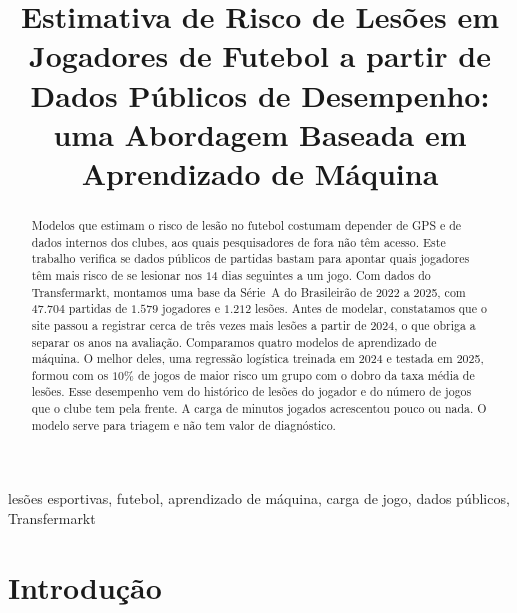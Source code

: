 \documentclass[conference]{IEEEtran}
\begin{document}
\title{Estimativa de Risco de Lesões em Jogadores de Futebol a partir de Dados Públicos de Desempenho: uma Abordagem Baseada em Aprendizado de Máquina}

\author{
\and
{}
}

\maketitle

\begin{abstract}
Modelos que estimam o risco de lesão no futebol costumam depender de GPS e de dados internos dos clubes, aos quais pesquisadores de fora não têm acesso. Este trabalho verifica se dados públicos de partidas bastam para apontar quais jogadores têm mais risco de se lesionar nos $14$ dias seguintes a um jogo. Com dados do Transfermarkt, montamos uma base da Série~A do Brasileirão de 2022 a 2025, com $47{.}704$ partidas de $1{.}579$ jogadores e $1{.}212$ lesões. Antes de modelar, constatamos que o site passou a registrar cerca de três vezes mais lesões a partir de 2024, o que obriga a separar os anos na avaliação. Comparamos quatro modelos de aprendizado de máquina. O melhor deles, uma regressão logística treinada em 2024 e testada em 2025, formou com os $10\%$ de jogos de maior risco um grupo com o dobro da taxa média de lesões. Esse desempenho vem do histórico de lesões do jogador e do número de jogos que o clube tem pela frente. A carga de minutos jogados acrescentou pouco ou nada. O modelo serve para triagem e não tem valor de diagnóstico.
\end{abstract}

\begin{IEEEkeywords}
lesões esportivas, futebol, aprendizado de máquina, carga de jogo, dados públicos, Transfermarkt
\end{IEEEkeywords}

\section{Introdução}
\end{document}
